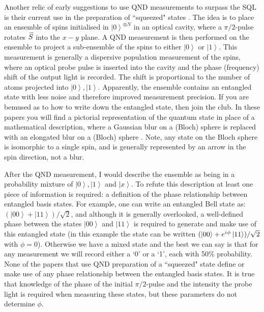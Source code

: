 \documentclass[reqno]{amsart}
\newcommand{\ket}[1]{\left| #1 \right>}
\newcommand{\iu}{{i\mkern1mu}}
\newcommand{\myvec}[1]{\accentset{\rightharpoonup}{#1}}
\begin{document}
Another relic of early suggestions to use QND measurements to surpass the SQL is their current use in the preparation of ``squeezed" states \cite{Kuzmich2000, Appel2009,   Koschorreck2010, LouchetChauvet2010, SchleierSmith2010, Sewell2012, Bohnet2014, Cox2016, Hosten2016, Hosten2016a, Braverman2019, Malia2020, Greve2022, Malia2022}. The idea is to place an ensemble of spins initialised in $\ket{0}^{\otimes N}$ in an optical cavity, where a $\pi/2$-pulse rotates $\myvec{S}$ into the $x - y$ plane. A QND measurement is then performed on the ensemble to project a sub-ensemble of the spins to either $\ket{0}$ or $\ket{1}$. This measurement is generally a dispersive population measurement of the spins, where an optical probe pulse is inserted into the cavity and the phase (frequency) shift of the output light is recorded. The shift is proportional to the number of atoms projected into $\ket{0},\ket{1}$. Apparently, the ensemble contains an entangled state with less noise and therefore improved measurement precision. If you are bemused as to how to write down the entangled state, then join the club. In these papers you will find a pictorial representation of the quantum state in place of a mathematical description, where a Gaussian blur on a (Bloch) sphere is replaced with an elongated blur on a (Bloch) sphere \cite{Gross2012, Pezze2018}. Note, any state on the Bloch sphere is isomorphic to a single spin, and is generally represented by an arrow in the spin direction, not a blur. 

After the QND measurement, I would describe the ensemble as being in a probability mixture of $\ket{0}, \ket{1}$ and $\ket{x}$. To refute this description at least one piece of information is required: a definition of the phase relationship between entangled basis states. For example, one can write an entangled Bell state as: $(\ket{00} + \ket{11})/\sqrt{2}$, and although it is generally overlooked, a well-defined phase between the states $\ket{00}$ and $\ket{11}$ is required to generate and make use of this entangled state (in this example the state can be written $(\ket{00} + e^{\iu \phi }\ket{11})/\sqrt{2}$ with $\phi = 0$). Otherwise we have a mixed state and the best we can say is that for any measurement we will record either a `0' or a `1', each with 50\% probability. None of the papers that use QND preparation of a ``squeezed" state define or make use of any phase relationship between the entangled basis states. It is true that knowledge of the phase of the initial $\pi/2$-pulse and the intensity the probe light is required when measuring these states, but these parameters do not determine $\phi$.\\
\end{document}
